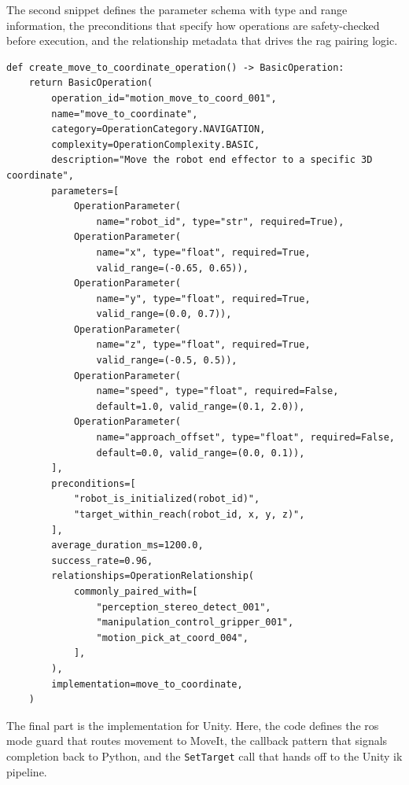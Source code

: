 The second snippet defines the parameter schema with type and range information, the preconditions that specify how operations are safety-checked before execution, and the relationship metadata that drives the \gls{rag} pairing logic.

\begin{lstlisting}[caption={Metadata registry definition detailing type schemas, preconditions, and operational relationships for RAG lookup.}, extendedchars=true]
def create_move_to_coordinate_operation() -> BasicOperation:
    return BasicOperation(
        operation_id="motion_move_to_coord_001",
        name="move_to_coordinate",
        category=OperationCategory.NAVIGATION,
        complexity=OperationComplexity.BASIC,
        description="Move the robot end effector to a specific 3D coordinate",
        parameters=[
            OperationParameter(
                name="robot_id", type="str", required=True),
            OperationParameter(
                name="x", type="float", required=True,
                valid_range=(-0.65, 0.65)),
            OperationParameter(
                name="y", type="float", required=True,
                valid_range=(0.0, 0.7)),
            OperationParameter(
                name="z", type="float", required=True,
                valid_range=(-0.5, 0.5)),
            OperationParameter(
                name="speed", type="float", required=False,
                default=1.0, valid_range=(0.1, 2.0)),
            OperationParameter(
                name="approach_offset", type="float", required=False,
                default=0.0, valid_range=(0.0, 0.1)),
        ],
        preconditions=[
            "robot_is_initialized(robot_id)",
            "target_within_reach(robot_id, x, y, z)",
        ],
        average_duration_ms=1200.0,
        success_rate=0.96,
        relationships=OperationRelationship(
            commonly_paired_with=[
                "perception_stereo_detect_001",
                "manipulation_control_gripper_001",
                "motion_pick_at_coord_004",
            ],
        ),
        implementation=move_to_coordinate,
    )
\end{lstlisting}

The final part is the implementation for Unity. Here, the code defines the \gls{ros} mode guard that routes movement to MoveIt, the callback pattern that signals completion back to Python, and the \texttt{SetTarget} call that hands off to the Unity \gls{ik} pipeline.

